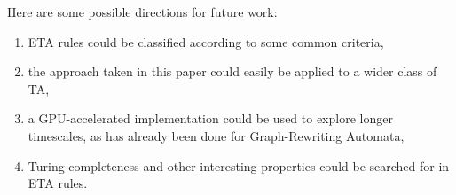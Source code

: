 \documentclass{article}
\begin{document}
\noindent Here are some possible directions for future work:
\begin{enumerate}
\item ETA rules could be classified according to some common criteria,
\item the approach taken in this paper could easily be applied to a wider class of TA,
\item a GPU-accelerated implementation could be used to explore longer timescales, as has already been done for Graph-Rewriting Automata\cite{GRAweb},
\item Turing completeness and other interesting properties could be searched for in ETA rules.
\end{enumerate}



\end{document}
